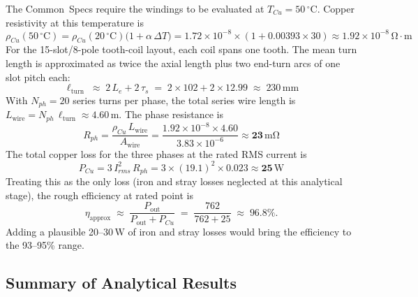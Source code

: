 \documentclass[12pt,a4paper]{article}
\newcommand{\unit}[1]{\ensuremath{\,\mathrm{#1}}}
\newcommand{\degree}{\ensuremath{^{\circ}}}
\begin{document}
The Common~Specs require the windings to be evaluated at
$T_{Cu} = 50\unit{\degree C}$.
Copper resistivity at this temperature is
\begin{equation}
  \rho_{Cu}(50\unit{\degree C})
    = \rho_{Cu}(20\unit{\degree C})\bigl(1 + \alpha\,\Delta T\bigr)
    = 1.72\times10^{-8} \times (1 + 0.00393 \times 30)
    \approx 1.92\times10^{-8}\unit{\Omega\!\cdot\!m}
\end{equation}
For the 15-slot/8-pole tooth-coil layout, each coil spans one tooth.
The mean turn length is approximated as twice the axial length plus
two end-turn arcs of one slot pitch each:
\begin{equation}
  \ell_{\text{turn}}
    \;\approx\; 2\,L_e + 2\,\tau_s
    \;=\; 2 \times 102 + 2 \times 12.99
    \;\approx\; 230\unit{mm}
\end{equation}
With $N_{ph} = 20$ series turns per phase, the total series wire length
is $L_{\text{wire}} = N_{ph}\,\ell_{\text{turn}} \approx 4.60\unit{m}$.
The phase resistance is
\begin{equation}
  R_{ph}
    = \frac{\rho_{Cu}\,L_{\text{wire}}}{A_{\text{wire}}}
    = \frac{1.92\times10^{-8} \times 4.60}{3.83\times10^{-6}}
    \approx \mathbf{23\unit{m\Omega}}
\end{equation}
The total copper loss for the three phases at the rated RMS current is
\begin{equation}
  P_{Cu}
    = 3\,I_{rms}^{2}\,R_{ph}
    = 3 \times (19.1)^{2} \times 0.023
    \approx \mathbf{25\unit{W}}
\end{equation}
Treating this as the only loss (iron and stray losses neglected at
this analytical stage), the rough efficiency at rated point is
\begin{equation}
  \eta_{\text{approx}}
    \;\approx\; \frac{P_{\text{out}}}{P_{\text{out}} + P_{Cu}}
    \;=\; \frac{762}{762 + 25}
    \;\approx\; \mathbf{96.8\%}.
\end{equation}
Adding a plausible 20--30\unit{W} of iron and stray losses would bring
the efficiency to the 93--95\% range.

\subsection{Summary of Analytical Results}
\end{document}
